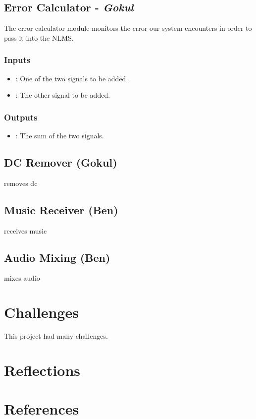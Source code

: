 \documentclass{fpgairpods}
\begin{document}
\subsection{Error Calculator - \textit{Gokul}}
The error calculator module monitors the error our system encounters in order to pass it into the NLMS.

\subsubsection{Inputs}
\begin{itemize}
    \item {}: One of the two signals to be added.
    \item {}: The other signal to be added.
\end{itemize}
\subsubsection{Outputs}
\begin{itemize}
    \item {}: The sum of the two signals.
\end{itemize}

\subsection{DC Remover (Gokul)}
removes dc

\subsection{Music Receiver (Ben)}
receives music

\subsection{Audio Mixing (Ben)}
mixes audio

\section{Challenges}
This project had many challenges.

\section{Reflections}

\section{References}

\printbibliography
\end{document}
